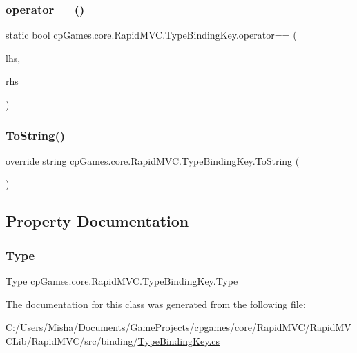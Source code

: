 \subsubsection{\texorpdfstring{operator==()}{operator==()}}
{\footnotesize\ttfamily static bool cp\+Games.\+core.\+Rapid\+M\+V\+C.\+Type\+Binding\+Key.\+operator== (\begin{DoxyParamCaption}\item[{\mbox{\hyperlink{classcp_games_1_1core_1_1_rapid_m_v_c_1_1_type_binding_key}{Type\+Binding\+Key}}}]{lhs,  }\item[{\mbox{\hyperlink{interfacecp_games_1_1core_1_1_rapid_m_v_c_1_1_i_binding_key}{I\+Binding\+Key}}}]{rhs }\end{DoxyParamCaption})\hspace{0.3cm}{\ttfamily [static]}}

\mbox{\label{classcp_games_1_1core_1_1_rapid_m_v_c_1_1_type_binding_key_a4f28fb3ba3a6236fe700e2f65e1d7e33}} 
\subsubsection{\texorpdfstring{ToString()}{ToString()}}
{\footnotesize\ttfamily override string cp\+Games.\+core.\+Rapid\+M\+V\+C.\+Type\+Binding\+Key.\+To\+String (\begin{DoxyParamCaption}{ }\end{DoxyParamCaption})}



\subsection{Property Documentation}
\mbox{\label{classcp_games_1_1core_1_1_rapid_m_v_c_1_1_type_binding_key_a2607ca6b5f825138867c84fb68fb159e}} 
\subsubsection{\texorpdfstring{Type}{Type}}
{\footnotesize\ttfamily Type cp\+Games.\+core.\+Rapid\+M\+V\+C.\+Type\+Binding\+Key.\+Type\hspace{0.3cm}{\ttfamily [get]}}



The documentation for this class was generated from the following file\+:\begin{DoxyCompactItemize}
\item 
C\+:/\+Users/\+Misha/\+Documents/\+Game\+Projects/cpgames/core/\+Rapid\+M\+V\+C/\+Rapid\+M\+V\+C\+Lib/\+Rapid\+M\+V\+C/src/binding/\mbox{\hyperlink{_type_binding_key_8cs}{Type\+Binding\+Key.\+cs}}\end{DoxyCompactItemize}
